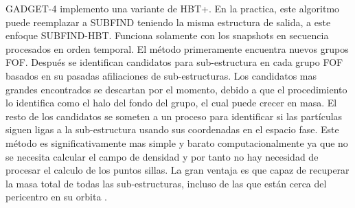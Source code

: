 GADGET-4 implemento una variante de HBT+. En la practica, este algoritmo puede reemplazar a SUBFIND teniendo la misma estructura de salida, a este enfoque SUBFIND-HBT. Funciona solamente con los snapshots en secuencia procesados en orden temporal. El método primeramente encuentra nuevos grupos FOF. Después se identifican candidatos para sub-estructura en cada grupo FOF basados en su pasadas afiliaciones de sub-estructuras. Los candidatos mas grandes encontrados se descartan por el momento, debido a que el procedimiento lo identifica como el halo del fondo del grupo, el cual puede crecer en masa. El resto de los candidatos se someten a un proceso para identificar si las partículas siguen ligas a la sub-estructura usando sus coordenadas en el espacio fase. Este método es significativamente mas simple y barato computacionalmente ya que no se necesita calcular el campo de densidad y por tanto no hay necesidad de procesar el calculo de los puntos sillas. La gran ventaja es que capaz de recuperar la masa total de todas las sub-estructuras, incluso de las que están cerca del pericentro en su orbita \cite{2021MNRAS.506.2871S}.